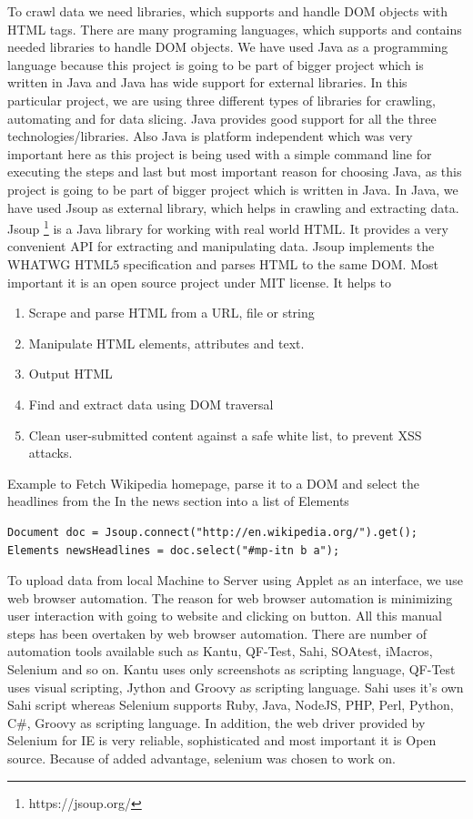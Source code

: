 \documentclass[article,type=msc,colorback,accentcolor=tud9c,twoside,11pt]{tudthesis}
\begin{document}
To crawl data we need libraries, which supports and handle DOM objects with HTML tags. There are many programing languages, which supports and contains needed libraries to handle DOM objects. We have used Java as a programming language because this project is going to be part of bigger project which is written in Java and Java has wide support for external libraries. In this particular project, we are using three different types of libraries for crawling, automating and for data slicing. Java provides good support for all the three technologies/libraries. Also Java is platform independent which was very important here as this project is being used with a simple command line for executing the steps and last but most important reason for choosing Java, as this project is going to be part of bigger project which is written in Java. In Java, we have used Jsoup as external library, which helps in crawling and extracting data. Jsoup \footnote{https://jsoup.org/} is a Java library for working with real world HTML. It provides a very convenient API for extracting and manipulating data. Jsoup implements the WHATWG HTML5 specification and parses HTML to the same DOM. Most important it is an open source project under MIT license. It helps to
\begin{enumerate}
\item Scrape and parse HTML from a URL, file or string
\item Manipulate HTML elements, attributes and text.
\item Output HTML
\item Find and extract data using DOM traversal
\item Clean user-submitted content against a safe white list, to prevent XSS attacks.
\end{enumerate}
Example to Fetch Wikipedia homepage, parse it to a DOM and select the headlines from the In the news section into a list of Elements

\begin{lstlisting}
Document doc = Jsoup.connect("http://en.wikipedia.org/").get();
Elements newsHeadlines = doc.select("#mp-itn b a");
\end{lstlisting}

To upload data from local Machine to Server using Applet as an interface, we use web browser automation. The reason for web browser automation is minimizing user interaction with going to website and clicking on button. All this manual steps has been overtaken by web browser automation. There are number of automation tools available such as Kantu, QF-Test, Sahi, SOAtest, iMacros, Selenium and so on. Kantu uses only screenshots as scripting language, QF-Test uses visual scripting, Jython and Groovy as scripting language. Sahi uses it's own Sahi script whereas Selenium supports Ruby, Java, NodeJS, PHP, Perl, Python, C\#, Groovy as scripting language. In addition, the web driver provided by Selenium for IE is very reliable, sophisticated and most important it is Open source. Because of added advantage, selenium was chosen to work on.
\end{document}
